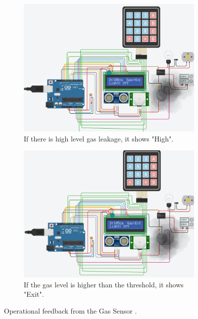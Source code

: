 \documentclass[a4paper,12pt]{article}
\begin{document}
\begin{figure}[H]
  \begin{subfigure}{0.45\textwidth}
      \centering
      \includegraphics[width=\linewidth]{gassensor4.png}
      \caption{If there is high level gas leakage, it shows "High".}
  \end{subfigure}
  \hfill
  \begin{subfigure}{0.45\textwidth}
      \centering
      \includegraphics[width=\linewidth]{gassensor2.png}
      \caption{If the gas level is higher than the threshold, it shows "Exit".}
  \end{subfigure} 

  \caption{Operational feedback from the  Gas Sensor .}
  \label{fig:circuit_overview}
\end{figure}
\end{document}
